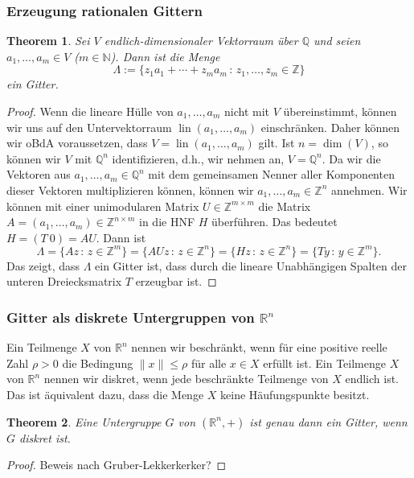 \documentclass[
a4paper,12pt,
bibliography=totocnumbered,
numbers=noenddot,
]{scrartcl}
\numberwithin{equation}{subsection}
\newcommand{\N}{\mathbb N}
\newcommand{\Z}{\mathbb Z}
\newcommand{\Q}{\mathbb Q}
\newcommand{\R}{\mathbb R}
\newcommand{\lin}{\operatorname{lin}} %
\theoremstyle{plain}
\newtheorem*{thm}{Theorem}
\theoremstyle{definition}
\begin{document}
\subsubsection{Erzeugung rationalen Gittern} 

\begin{thm}
	Sei $V$ endlich-dimensionaler Vektorraum über $\Q$ und seien $a_1,\ldots,a_m \in V$ ($m \in \N$). Dann ist die Menge
	\[
		\Lambda := \{ z_1 a_1 + \cdots + z_m a_m \,:\, z_1,\ldots,z_m \in \Z \} 
	\]
	ein Gitter. 
\end{thm} 
\begin{proof} 
	Wenn die lineare Hülle von $a_1,\ldots,a_m$ nicht mit $V$ übereinstimmt, können wir uns auf den Untervektorraum $\lin(a_1,\ldots,a_m)$ einschränken. Daher können wir oBdA voraussetzen, dass $V =\lin(a_1,\ldots,a_m)$ gilt. Ist $n=\dim(V)$, so können wir $V$ mit $\Q^n$ identifizieren, d.h., wir nehmen an, $V = \Q^n$. Da wir die Vektoren aus $a_1,\ldots,a_m \in \Q^n$ mit dem gemeinsamen Nenner aller Komponenten dieser Vektoren multiplizieren können, können wir $a_1,\ldots,a_m \in \Z^n$ annehmen. Wir können mit einer unimodularen Matrix $U \in \Z^{m \times m}$ die Matrix $A = (a_1,\ldots,a_m) \in \Z^{n \times m}$ in die HNF $H$ überführen. Das bedeutet $H= (T \ 0) = A U$. Dann ist 
	\[
		\Lambda = \{ A z \,:\, z \in \Z^m \} = \{ A U z \,:\, z \in \Z^n \}  = \{ H z \,:\, z \in \Z^n \} = \{ T y \,:\, y \in \Z^m \}.
	\]
	Das zeigt, dass $\Lambda$ ein Gitter ist, dass durch die lineare Unabhängigen Spalten der unteren Dreiecksmatrix $T$ erzeugbar ist. 
\end{proof} 


\subsubsection{Gitter als diskrete Untergruppen von $\R^n$} 

Ein Teilmenge $X$ von $\R^n$ nennen wir beschränkt, wenn für eine positive reelle Zahl $\rho>0$ die Bedingung $\|x\| \le \rho$ für alle $x \in X$ erfüllt ist. 
Ein Teilmenge $X$ von $\R^n$ nennen wir diskret, wenn jede beschränkte Teilmenge von $X$ endlich ist. Das ist äquivalent dazu, dass die Menge $X$ keine Häufungspunkte besitzt. 

\begin{thm}
	Eine Untergruppe $G$ von $(\R^n,+)$ ist genau dann ein Gitter, wenn $G$ diskret ist. 
\end{thm} 
\begin{proof}
	Beweis nach Gruber-Lekkerkerker?
\end{proof} 
\end{document}
